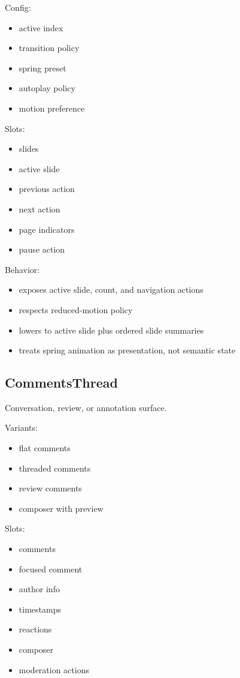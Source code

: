 Config:

\begin{itemize}
\tightlist
\item
  active index
\item
  transition policy
\item
  spring preset
\item
  autoplay policy
\item
  motion preference
\end{itemize}

Slots:

\begin{itemize}
\tightlist
\item
  slides
\item
  active slide
\item
  previous action
\item
  next action
\item
  page indicators
\item
  pause action
\end{itemize}

Behavior:

\begin{itemize}
\tightlist
\item
  exposes active slide, count, and navigation actions
\item
  respects reduced-motion policy
\item
  lowers to active slide plus ordered slide summaries
\item
  treats spring animation as presentation, not semantic state
\end{itemize}

\subsection{CommentsThread}\label{record-128-commentsthread}

Conversation, review, or annotation surface.

Variants:

\begin{itemize}
\tightlist
\item
  flat comments
\item
  threaded comments
\item
  review comments
\item
  composer with preview
\end{itemize}

Slots:

\begin{itemize}
\tightlist
\item
  comments
\item
  focused comment
\item
  author info
\item
  timestamps
\item
  reactions
\item
  composer
\item
  moderation actions
\end{itemize}

